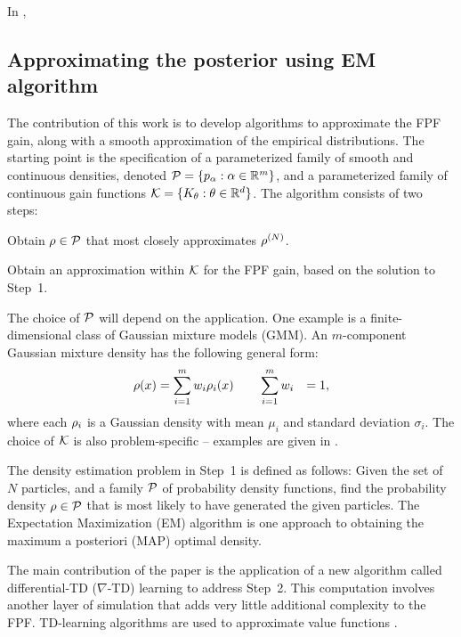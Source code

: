 In , 
	\subsection{Approximating the posterior using EM algorithm}
	\label{s:fpf_em}
	The contribution of this work is to develop algorithms to approximate the FPF gain, along with a smooth approximation of the empirical distributions.  The starting point is the specification of a parameterized family  of smooth and continuous densities, denoted  ${\cal P} = \{ p_\alpha : \alpha\in\mathbb{R}^m\}$,  and a parameterized family of continuous gain functions ${\cal K} = \{K_\theta : \theta\in\mathbb{R}^d\}$.
	The algorithm consists of two steps:
	\begin{arabnum}
		\item Obtain $\rho\in{\cal P} $ that most closely approximates $\rho^{(N)}$.
		\item  Obtain an approximation within ${\cal K}$ for the FPF gain, based on the solution to Step~1.
	\end{arabnum}
	The choice of ${\cal P}$ will depend on the application.
	One example is a finite-dimensional class of Gaussian mixture models (GMM). An $m$-component Gaussian mixture density has the following general form:
	\begin{equation*}
	\begin{aligned}
	\pr(x)& = \sum_{i=1}^{m} w_{i} \pr_{i}(x) \qquad  \sum_{i=1}^{m} w_{i} &=1 ,
	\label{e:gaussian_mix}
	\end{aligned}
	\end{equation*}
	\noindent
	where each $\rho_{i}$ is a Gaussian density with mean $\mu_{i}$ and standard deviation $\sigma_{i}$.
	The choice of ${\cal K}$ is also problem-specific -- examples are given in .
	
	The density estimation problem in Step~1 is defined as follows: Given the set of $N$ particles, and a family ${\cal P} $ of probability density functions,  find the probability density $\rho \in {\cal P} $ that is most likely to have generated the given particles.  The Expectation Maximization (EM) algorithm is one approach to obtaining the maximum a posteriori (MAP) optimal density.
	
	The main contribution of the paper is the application of a new algorithm called differential-TD ($\nabla$-TD) learning to address Step~2.  
	This computation involves another layer of simulation that adds very little additional complexity to the FPF. 
	TD-learning algorithms are used to approximate value functions \cite{bertsi96a}.  
	
